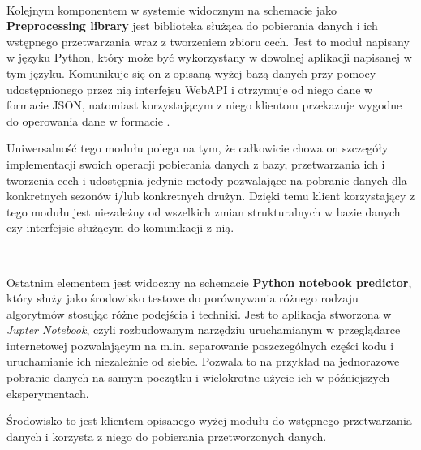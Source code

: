 ~

Kolejnym komponentem w systemie widocznym na schemacie jako \textbf{Preprocessing library} jest biblioteka służąca do pobierania danych i ich wstępnego przetwarzania wraz z tworzeniem zbioru cech. Jest to moduł napisany w języku Python, który może być wykorzystany w dowolnej aplikacji napisanej w tym języku. Komunikuje się on z opisaną wyżej bazą danych przy pomocy udostępnionego przez nią interfejsu WebAPI i otrzymuje od niego dane w formacie JSON, natomiast korzystającym z niego klientom przekazuje wygodne do operowania dane w formacie . 

Uniwersalność tego modułu polega na tym, że całkowicie chowa on szczegóły implementacji swoich operacji pobierania danych z bazy, przetwarzania ich i tworzenia cech i udostępnia jedynie metody pozwalające na pobranie danych dla konkretnych sezonów i/lub konkretnych drużyn. Dzięki temu klient korzystający z tego modułu jest niezależny od wszelkich zmian strukturalnych w bazie danych czy interfejsie służącym do komunikacji z nią.

~

Ostatnim elementem jest widoczny na schemacie \textbf{Python notebook predictor}, który służy jako środowisko testowe do porównywania różnego rodzaju algorytmów stosując różne podejścia i techniki. Jest to aplikacja stworzona w \textit{Jupter Notebook}, czyli rozbudowanym narzędziu uruchamianym w przeglądarce internetowej pozwalającym na m.in. separowanie poszczególnych części kodu i uruchamianie ich niezależnie od siebie. Pozwala to na przykład na jednorazowe pobranie danych na samym początku i wielokrotne użycie ich w późniejszych eksperymentach.

Środowisko to jest klientem opisanego wyżej modułu do wstępnego przetwarzania danych i korzysta z niego do pobierania przetworzonych danych. 

\newpage
